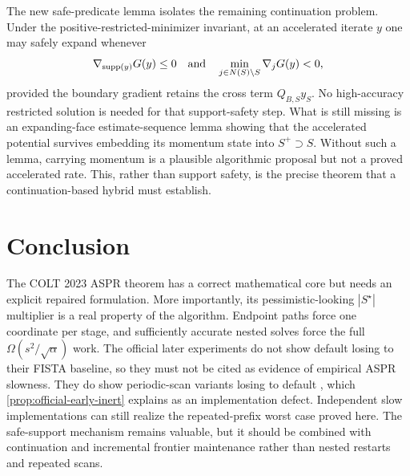 \documentclass[11pt]{article}
\begin{document}
The new safe-predicate lemma isolates the remaining continuation problem.
Under the positive-restricted-minimizer invariant, at an accelerated iterate
$y$ one may safely expand whenever
\[
 \nabla_{\operatorname{supp}(y)}G(y)\leq0
 \quad\text{and}\quad
 \min_{j\in N(S)\setminus S}\nabla_jG(y)<0,
\]
provided the boundary gradient retains the cross term $Q_{B,S}y_S$.  No
high-accuracy restricted solution is needed for that support-safety step.
What is still missing is an expanding-face estimate-sequence lemma showing
that the accelerated potential survives embedding its momentum state into
$S^+\supset S$.  Without such a lemma, carrying momentum is a plausible
algorithmic proposal but not a proved accelerated rate.  This, rather than
support safety, is the precise theorem that a continuation-based hybrid must
establish.

\section{Conclusion}

The COLT 2023 ASPR theorem has a correct mathematical core but needs an
explicit repaired formulation.  More importantly, its pessimistic-looking
$|S^\star|$ multiplier is a real property of the algorithm.  Endpoint paths
force one coordinate per stage, and sufficiently accurate nested solves force
the full $\Omega(s^2/\sqrt\alpha)$ work.  The official later experiments do
not show default \ASPR{} losing to their FISTA baseline, so they must not be
cited as evidence of empirical ASPR slowness.  They do show periodic-scan
variants losing to default \ASPR{}, which
\cref{prop:official-early-inert} explains as an implementation defect.
Independent slow implementations can still realize the repeated-prefix
worst case proved here.  The safe-support mechanism remains valuable, but it
should be combined with continuation and incremental frontier maintenance
rather than nested restarts and repeated scans.
\end{document}
